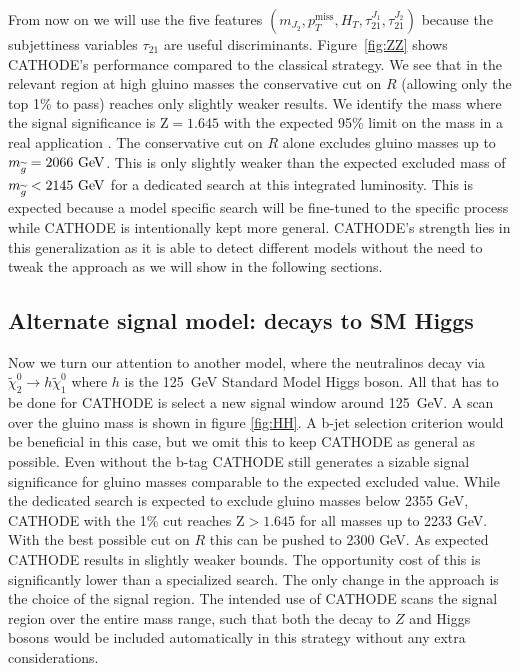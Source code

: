 \documentclass[prd, twocolumn, superscriptaddress,floatfix, nofootinbib, preprintnumbers]{revtex4-2}
\begin{document}
From now on we will use the five features $\left(m_{J_2}, p_T^\text{miss},H_T, \tau_{21}^{J_1},\tau_{21}^{J_2}\right)$ because the subjettiness variables $\tau_{21}$ are useful discriminants. Figure~\ref{fig:ZZ} shows CATHODE's performance compared to the classical strategy. We see that in the relevant region at high gluino masses the conservative cut on $R$ (allowing only the top 1\% to pass) reaches only slightly weaker results. We identify the mass where the signal significance is $\text{Z}=1.645$ with the expected 95\% limit on the mass in a real application \cite{Bhattiprolu_2021}. The conservative cut on $R$ alone excludes gluino masses up to $m_{\widetilde{g}}=2066~{\rm GeV}$. This is only slightly weaker than the expected excluded mass of $m_{\widetilde{g}}<2145~{\rm GeV}$ for a dedicated search at this integrated luminosity. This is expected because a model specific search will be fine-tuned to the specific process while CATHODE is intentionally kept more general. CATHODE's strength lies in this generalization as it is able to detect different models without the need to tweak the approach as we will show in the following sections.



\subsection{Alternate signal model: decays to SM Higgs}


Now we turn our attention to another model, where the neutralinos decay via $\widetilde{\chi}_2^0 \rightarrow h \widetilde{\chi}_1^0$ where $h$ is the 125~GeV Standard Model Higgs boson. All that has to be done for CATHODE is select a new signal window around 125~GeV. A scan over the gluino mass is shown in figure \ref{fig:HH}. A b-jet selection criterion would be beneficial in this case, but we omit this to keep CATHODE as general as possible. Even without the b-tag CATHODE still generates a sizable signal significance for gluino masses comparable to the expected excluded value. While the dedicated search is expected to exclude gluino masses below 2355 GeV, CATHODE with the 1\% cut reaches $\text{Z}>1.645$ for all masses up to 2233 GeV. With the best possible cut on $R$ this can be pushed to 2300 GeV. As expected CATHODE results in slightly weaker bounds. The opportunity cost of this is significantly lower than a specialized search. The only change in the approach is the choice of the signal region. The intended use of CATHODE scans the signal region over the entire mass range, such that both the decay to $Z$ and Higgs bosons would be included automatically in this strategy without any extra considerations. 
\end{document}
